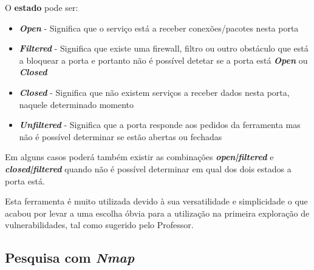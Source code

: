 \documentclass[10pt,english]{article}
\begin{document}
\par O \textbf{estado} pode ser:
 \begin{itemize}
    \item {\textbf{\textit{Open}}} - Significa que o serviço está a receber conexões/pacotes nesta porta
    
     \item {\textbf{\textit{Filtered}}} - Significa que existe uma firewall, filtro ou outro obstáculo que está a bloquear a porta e portanto não é possível detetar se a porta está \textbf{\textit{Open}} ou \textbf{\textit{Closed}}
     
     \item {\textbf{\textit{Closed}}} - Significa que não existem serviços a receber dados nesta porta, naquele determinado momento
     
     \item {\textbf{\textit{Unfiltered}}} - Significa que a porta responde aos pedidos da ferramenta mas não é possível determinar se estão abertas ou fechadas
   
 \end{itemize}
 
 \par Em alguns casos poderá também existir as combinações \textbf{\textit{open|filtered}} e \textbf{\textit{closed|filtered}} quando não é possível determinar em qual dos dois estados a porta está.
 


\par Esta ferramenta é muito utilizada devido à sua versatilidade e simplicidade o que acabou por levar a uma escolha óbvia para a utilização na primeira exploração de vulnerabilidades, tal como sugerido pelo Professor.

\subsection{Pesquisa com \textit{Nmap}}
\end{document}
